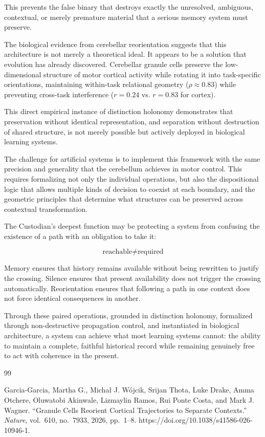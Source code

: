 \documentclass[12pt]{article}
\begin{document}
This prevents the false binary that destroys exactly the unresolved, ambiguous, contextual, or merely premature material that a serious memory system must preserve.

The biological evidence from cerebellar reorientation suggests that this architecture is not merely a theoretical ideal. It appears to be a solution that evolution has already discovered. Cerebellar granule cells preserve the low-dimensional structure of motor cortical activity while rotating it into task-specific orientations, maintaining within-task relational geometry ($\rho \approx 0.83$) while preventing cross-task interference ($r = 0.24$ vs. $r = 0.83$ for cortex).

This direct empirical instance of distinction holonomy demonstrates that preservation without identical representation, and separation without destruction of shared structure, is not merely possible but actively deployed in biological learning systems.

The challenge for artificial systems is to implement this framework with the same precision and generality that the cerebellum achieves in motor control. This requires formalizing not only the individual operations, but also the dispositional logic that allows multiple kinds of decision to coexist at each boundary, and the geometric principles that determine what structures can be preserved across contextual transformation.

The Custodian's deepest function may be protecting a system from confusing the existence of a path with an obligation to take it:

\begin{equation}
\boxed{\text{reachable} \neq \text{required}}
\end{equation}

Memory ensures that history remains available without being rewritten to justify the crossing. Silence ensures that present availability does not trigger the crossing automatically. Reorientation ensures that following a path in one context does not force identical consequences in another.

Through these paired operations, grounded in distinction holonomy, formalized through non-destructive propagation control, and instantiated in biological architecture, a system can achieve what most learning systems cannot: the ability to maintain a complete, faithful historical record while remaining genuinely free to act with coherence in the present.

\newpage

\begin{thebibliography}{99}

Garcia-Garcia, Martha G., Michał J. Wójcik, Srijan Thota, Luke Drake, Amma Otchere, Oluwatobi Akinwale, Lizmaylin Ramos, Rui Ponte Costa, and Mark J. Wagner. ``Granule Cells Reorient Cortical Trajectories to Separate Contexts.'' \textit{Nature}, vol.~610, no.~7933, 2026, pp.~1--8. https://doi.org/10.1038/s41586-026-10946-1.

\end{thebibliography}
\end{document}
